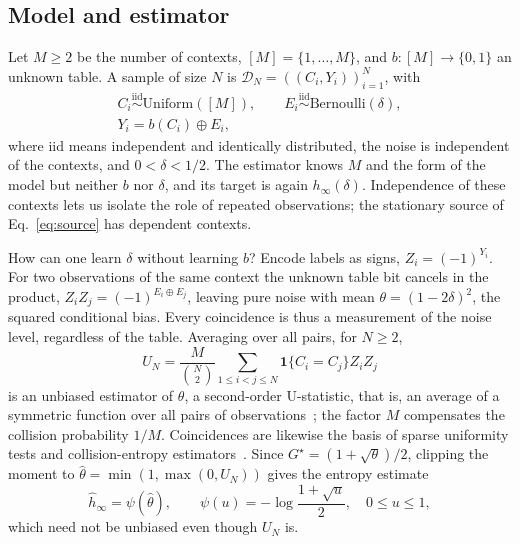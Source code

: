 \documentclass[11pt,a4paper]{article}
\newcommand{\bits}{\{0,1\}}
\newcommand{\I}{\mathbf{1}}
\begin{document}
\subsection{Model and estimator}

Let \(M\ge2\) be the number of contexts, \([M]=\{1,\ldots,M\}\), and \(b:[M]\to\bits\) an unknown table. A sample of size \(N\) is \(\mathcal D_N=((C_i,Y_i))_{i=1}^N\), with
\begin{equation}
\begin{gathered}
C_i\overset{\mathrm{iid}}{\sim}\mathrm{Uniform}([M]),\qquad
E_i\overset{\mathrm{iid}}{\sim}\mathrm{Bernoulli}(\delta),\\
Y_i=b(C_i)\oplus E_i,
\end{gathered}
\label{eq:iid-table}
\end{equation}
where iid means independent and identically distributed, the noise is independent of the contexts, and \(0<\delta<1/2\). The estimator knows \(M\) and the form of the model but neither \(b\) nor \(\delta\), and its target is again \(h_\infty(\delta)\). Independence of these contexts lets us isolate the role of repeated observations; the stationary source of Eq.~\eqref{eq:source} has dependent contexts.

How can one learn \(\delta\) without learning \(b\)? Encode labels as signs, \(Z_i=(-1)^{Y_i}\). For two observations of the same context the unknown table bit cancels in the product, \(Z_iZ_j=(-1)^{E_i\oplus E_j}\), leaving pure noise with mean \(\theta=(1-2\delta)^2\), the squared conditional bias. Every coincidence is thus a measurement of the noise level, regardless of the table. Averaging over all pairs, for \(N\ge2\),
\begin{equation}
U_N=\frac{M}{\binom N2}\sum_{1\le i<j\le N}\I\{C_i=C_j\}Z_iZ_j
\label{eq:moment}
\end{equation}
is an unbiased estimator of \(\theta\), a second-order U-statistic, that is, an average of a symmetric function over all pairs of observations~\cite{hoeffding1948statistics}; the factor \(M\) compensates the collision probability \(1/M\). Coincidences are likewise the basis of sparse uniformity tests and collision-entropy estimators~\cite{paninski2008coincidence,skorski2023renyi}. Since \(G^\star=(1+\sqrt\theta)/2\), clipping the moment to \(\widehat\theta=\min(1,\max(0,U_N))\) gives the entropy estimate
\begin{equation}
\widehat h_\infty=\psi(\widehat\theta),
\qquad
\psi(u)=-\log\frac{1+\sqrt u}{2},\quad 0\le u\le1,
\label{eq:estimator}
\end{equation}
which need not be unbiased even though \(U_N\) is.
\end{document}
